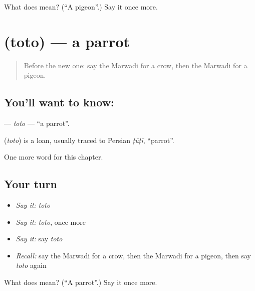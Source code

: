 \begin{tcolorbox}[breakable,colback=teal!4,colframe=teal!35!black,title={Before you move on}]
What does  mean? (\textquotedblleft{}A pigeon\textquotedblright{}.) Say it once more.
\end{tcolorbox}
\section[\texorpdfstring{\mw{तोतो} (toto)}{तोतो (toto)}]{ (toto) — a parrot}

\label{lesson:MW-C139-toto}



\begin{quote}
Before the new one: say the Marwadi for a crow, then the Marwadi for a pigeon.
\end{quote}

\subsection*{You'll want to know: }
\textbf{} — \emph{toto} — \textquotedblleft{}a parrot\textquotedblright{}.

\begin{cousinweb}
\textbf{} (\emph{toto}) is a loan, usually traced to Persian \emph{ṭūṭī}, \textquotedblleft{}parrot\textquotedblright{}.
\end{cousinweb}

\begin{grammarlens}[title={What you've built}]
One more word for this chapter.
\end{grammarlens}

\subsection*{Your turn}
\begin{itemize}
\raggedright
  \item \emph{Say it:} \emph{toto}
  \item \emph{Say it:} \emph{toto}, once more
  \item \emph{Say it:} say \emph{toto}
  \item \emph{Recall:} say the Marwadi for a crow, then the Marwadi for a pigeon, then say \emph{toto} again
\end{itemize}

\begin{tcolorbox}[breakable,colback=teal!4,colframe=teal!35!black,title={Before you move on}]
What does  mean? (\textquotedblleft{}A parrot\textquotedblright{}.) Say it once more.
\end{tcolorbox}
